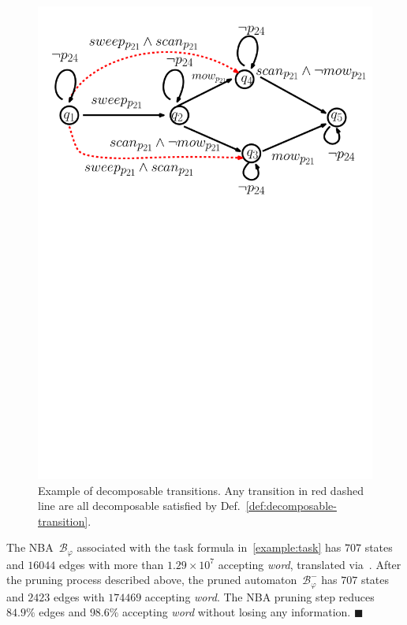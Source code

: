 \begin{figure}
\centering
\includegraphics[scale=0.35]{figures/example_decomposable.pdf}
\caption{
Example of decomposable transitions.
Any transition in red dashed line are all
decomposable satisfied by Def.~\ref{def:decomposable-transition}.}
\label{fig:example_decomposable}
\end{figure}

\begin{example}\label{eq:prune-nba}
The NBA~$\mathcal{B}_{\varphi}$ associated with the task formula in~\eqref{example:task}
has $707$ states and $16044$ edges with more than $1.29\times10^7$ accepting \emph{word},
translated via~\citep{gastin2001fast}.
After the pruning process described above, the pruned automaton~$\mathcal{B}^{-}_{\varphi}$
has $707$ states and $2423$ edges with $174469$ accepting \emph{word}. The NBA pruning step reduces $84.9\%$ edges and $98.6\%$
accepting \emph{word} without losing any information.
\hfill $\blacksquare$
\end{example}
